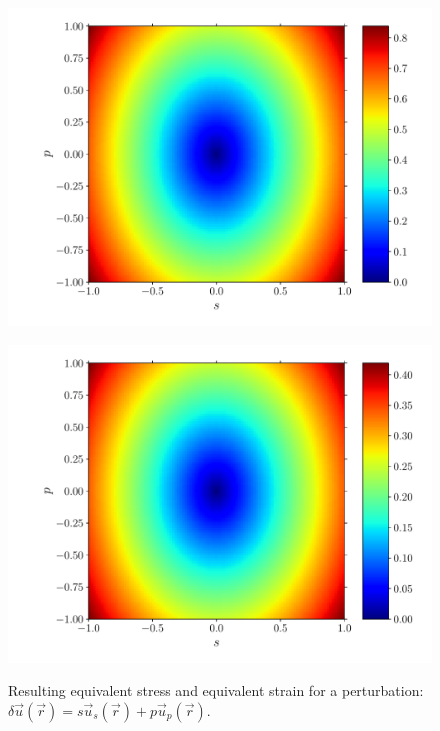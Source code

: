\documentclass[fleqn]{goose-article}
\begin{document}
\begin{figure}[htp]
    \centering
    \captionsetup[subfigure]{justification=centering}
    \begin{minipage}[t]{.49\textwidth}
        \centering
        \includegraphics[width=\textwidth]{phase-diagram_sig.pdf}
        \label{fig:phase-diagram:sig}
    \end{minipage}
    \hfill
    \begin{minipage}[t]{.49\textwidth}
        \centering
        \includegraphics[width=\textwidth]{phase-diagram_eps.pdf}
        \label{fig:phase-diagram:eps}
    \end{minipage}
    \caption{
        Resulting
         equivalent stress and
         equivalent strain
        for a perturbation:
        $\delta \vec{u}(\vec{r}) = s \vec{u}_s (\vec{r}) + p \vec{u}_p (\vec{r})$.
    }
    \label{fig:phase-diagram}
\end{figure}
\end{document}
